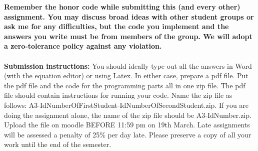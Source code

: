 \documentclass[11pt]{article}
\begin{document}
\maketitle

\textbf{Remember the honor code while submitting this (and every other) assignment. You may discuss broad ideas with other student groups or ask me for any difficulties, but the code you implement and the answers you write must be from members of the group. We will adopt a \textbf{zero-tolerance policy} against any violation.}
\\
\\
\textbf{Submission instructions:} You should ideally type out all the answers in Word (with the equation editor) or using Latex. In either case, prepare a pdf file. Put the pdf file and the code for the programming parts all in one zip file. The pdf file should contain instructions for running your code. Name the zip file as follows: A3-IdNumberOfFirstStudent-IdNumberOfSecondStudent.zip. If you are doing the assignment alone, the name of the zip file should be A3-IdNumber.zip. Upload the file on moodle BEFORE 11:59 pm on 19th March. Late assignments will be assessed a penalty of 25\% per day late. Please preserve a copy of all your work until the end of the semester. 
\end{document}
